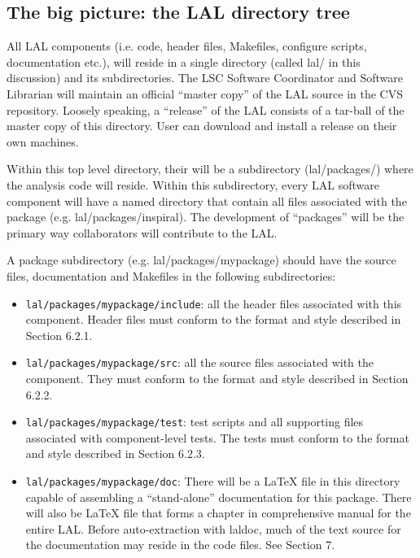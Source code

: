 \documentclass[]{ligodcc}
\begin{document}
\subsection{The big picture: the LAL directory tree}
All LAL components (i.e. code, header files, Makefiles, configure
scripts, documentation etc.), will reside in a single directory
(called lal/ in this discussion) and its subdirectories.  The LSC
Software Coordinator and Software Librarian will maintain an official
``master copy'' of the LAL source in the CVS repository. Loosely
speaking, a ``release'' of the LAL consists of a tar-ball of the
master copy of this directory. User can download and install a release
on their own machines. 

Within this top level directory, their will be a subdirectory
(lal/packages/) where the analysis code will reside. Within this
subdirectory, every LAL software component will have a named directory
that contain all files associated with the package (e.g.
lal/packages/inspiral). The development of ``packages'' will be the
primary way  collaborators will contribute to the LAL. 

A package subdirectory  (e.g. lal/packages/mypackage) should have the
source files, documentation  and Makefiles in the following
subdirectories:

\begin{itemize}
\item
{\tt lal/packages/mypackage/include}: all the header files
associated with this component.  Header files must conform to the
format and style described in Section 6.2.1.

\item
{\tt lal/packages/mypackage/src}:  all the source files associated
with the component. They must conform to the format and style
described in Section 6.2.2.


\item
{\tt lal/packages/mypackage/test}:  test scripts and all supporting
files  associated with component-level tests. The tests must conform
to the format and style described in Section 6.2.3.

\item
{\tt lal/packages/mypackage/doc}: There will be a LaTeX file in this
directory capable of assembling a ``stand-alone'' documentation for
this package. There will also be LaTeX file that forms a chapter in
comprehensive manual for the entire LAL. Before auto-extraction with
laldoc, much of the text source for the documentation may reside in
the code files. See Section 7.

\end{itemize}
\end{document}
